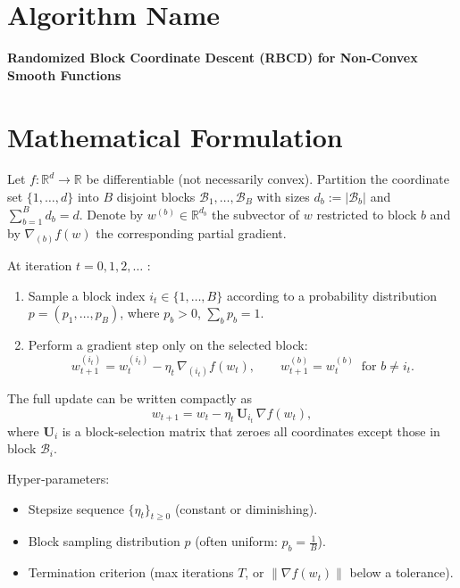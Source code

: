\documentclass{article}
\newcommand{\R}{\mathbb{R}}
\begin{document}
\section*{Algorithm Name}
\textbf{Randomized Block Coordinate Descent (RBCD) for Non‑Convex Smooth Functions}

\section*{Mathematical Formulation}
Let $f:\R^{d}\rightarrow\R$ be differentiable (not necessarily convex).  
Partition the coordinate set $\{1,\dots ,d\}$ into $B$ disjoint blocks 
$\mathcal{B}_1,\dots ,\mathcal{B}_B$ with sizes $d_b:=|\mathcal{B}_b|$ and
$\sum_{b=1}^{B}d_b=d$.
Denote by $w^{(b)}\in\R^{d_b}$ the subvector of $w$ restricted to block $b$
and by $\nabla_{(b)}f(w)$ the corresponding partial gradient.

At iteration $t=0,1,2,\dots$ :

\begin{enumerate}[label=\arabic*)]
\item Sample a block index $i_t\in\{1,\dots ,B\}$ according to a probability
distribution $p=(p_1,\dots ,p_B)$, where $p_b>0$, $\sum_{b}p_b=1$.
\item Perform a gradient step only on the selected block:
\[
w_{t+1}^{(i_t)} = w_{t}^{(i_t)} - \eta_t \,\nabla_{(i_t)} f(w_t),
\qquad 
w_{t+1}^{(b)} = w_{t}^{(b)}\;\;\text{for } b\neq i_t .
\]
\end{enumerate}

The full update can be written compactly as
\[
w_{t+1}=w_t - \eta_t\,\mathbf{U}_{i_t}\,\nabla f(w_t),
\]
where $\mathbf{U}_{i}$ is a block‑selection matrix that zeroes all
coordinates except those in block $\mathcal{B}_i$.

Hyper‑parameters:
\begin{itemize}
\item Stepsize sequence $\{\eta_t\}_{t\ge 0}$ (constant or diminishing).
\item Block sampling distribution $p$ (often uniform: $p_b=\frac{1}{B}$).
\item Termination criterion (max iterations $T$, or $\|\nabla f(w_t)\|$ below a tolerance).
\end{itemize}

\end{document}
